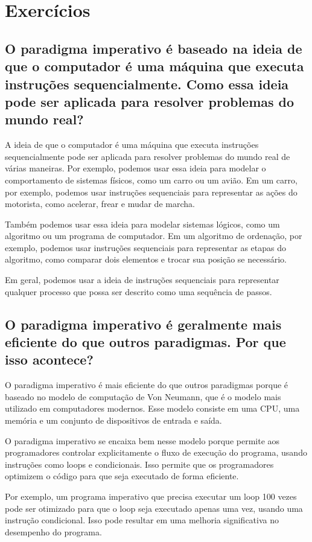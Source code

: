 \section{Exercícios}

\subsection{O paradigma imperativo é baseado na ideia de que o computador é uma máquina que executa instruções sequencialmente. Como essa ideia pode ser aplicada para resolver problemas do mundo real?}

A ideia de que o computador é uma máquina que executa instruções sequencialmente pode ser aplicada para resolver problemas do mundo real de várias maneiras. Por exemplo, podemos usar essa ideia para modelar o comportamento de sistemas físicos, como um carro ou um avião. Em um carro, por exemplo, podemos usar instruções sequenciais para representar as ações do motorista, como acelerar, frear e mudar de marcha.

Também podemos usar essa ideia para modelar sistemas lógicos, como um algoritmo ou um programa de computador. Em um algoritmo de ordenação, por exemplo, podemos usar instruções sequenciais para representar as etapas do algoritmo, como comparar dois elementos e trocar sua posição se necessário.

Em geral, podemos usar a ideia de instruções sequenciais para representar qualquer processo que possa ser descrito como uma sequência de passos.

\subsection{O paradigma imperativo é geralmente mais eficiente do que outros paradigmas. Por que isso acontece?}

O paradigma imperativo é mais eficiente do que outros paradigmas porque é baseado no modelo de computação de Von Neumann, que é o modelo mais utilizado em computadores modernos. Esse modelo consiste em uma CPU, uma memória e um conjunto de dispositivos de entrada e saída.

O paradigma imperativo se encaixa bem nesse modelo porque permite aos programadores controlar explicitamente o fluxo de execução do programa, usando instruções como loops e condicionais. Isso permite que os programadores optimizem o código para que seja executado de forma eficiente.

Por exemplo, um programa imperativo que precisa executar um loop 100 vezes pode ser otimizado para que o loop seja executado apenas uma vez, usando uma instrução condicional. Isso pode resultar em uma melhoria significativa no desempenho do programa.


